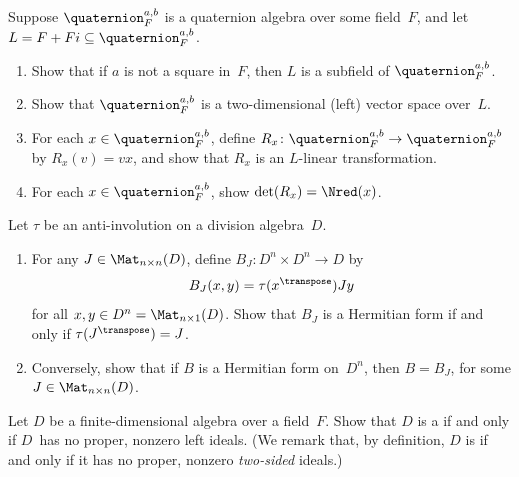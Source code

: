 \begin{exercises}
\item Suppose $\quaternion^{a,b}_F$ is a quaternion algebra
over some field~$F$, and let $L = F + Fi \subseteq \quaternion^{a,b}_F$. 
 \begin{enumerate}
 \item Show
that if $a$ is not a square in~$F$, then $L$ is a
subfield of $\quaternion^{a,b}_F$. 
 \item Show that $\quaternion^{a,b}_F$ is a two-dimensional (left) vector
space over~$L$.
 \item For each $x \in \quaternion^{a,b}_F$, define $R_x \colon \quaternion^{a,b}_F \to \quaternion^{a,b}_F$ by
$R_x(v) = vx$, and show that $R_x$ is an $L$-linear
transformation.
 \item For each $x \in \quaternion^{a,b}_F$, show $\det(R_x) = \Nred(x)$.
 \end{enumerate}

\item Let $\tau$ be an anti-involution on a division
algebra~$D$.
 \begin{enumerate}
 \item For any $J \in \Mat_{n \times n}(D)$, define $B_J
\colon D^n \times D^n \to D$ by 
 $$ B_J(x,y) = \tau(x^\transpose) J y $$
 for all $x,y \in D^n = \Mat_{n \times 1}(D)$. Show that
$B_J$ is a Hermitian form if and only if $\tau
(J^\transpose) = J$.
 \item Conversely, show that if $B$ is a Hermitian form
on~$D^n$, then  $B = B_J$, for some $J \in
\Mat_{n \times n}(D)$.
 \end{enumerate}

\item Let $D$ be a finite-dimensional algebra over
a field~$F$. Show that $D$ is a  if and only if $D$~has no proper, nonzero
left ideals. (We remark that, by definition, $D$ is
 if and only if it has no
proper, nonzero \emph{two-sided} ideals.)

 \end{exercises}








